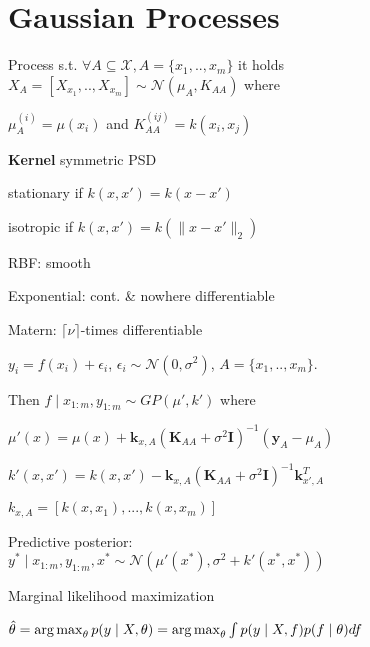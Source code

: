 \section{Gaussian Processes} 
Process s.t. $\forall A \subseteq \mathcal{X}, A = \{ x_1,.., x_m\}$
it holds {$X_A = [X_{x_1},..,X_{x_m}] \sim \mathcal{N}(\mu_A, K_{AA})$} where

$\mu_A^{(i)} = \mu(x_i)$ and $K_{AA}^{(ij)} = k(x_i, x_j)$   

\textbf{Kernel} symmetric PSD

stationary if $k(x,x') = k(x - x')$

isotropic if $k(x,x') = k(\|x - x'\|_2)$

RBF: smooth

Exponential: cont. \& nowhere differentiable

Matern: $\lceil\nu\rceil$-times differentiable


$y_i = f(x_i) + \epsilon_i$, $\epsilon_i \sim \mathcal{N}(0, \sigma^2)$, \mbox{\fontsize{9.2}{6}\selectfont $A = \{x_1,..,x_m\}$}.

Then {$f \mid  x_{1:m}, y_{1:m} \sim GP(\mu', k')$} where

{$\mu'(x) = \mu(x) + \mathbf{k}_{x,A} (\mathbf{K}_{AA} + \sigma^2 \mathbf{I})^{-1} (\mathbf{y}_A - \mu_A)$}

{$k'(x,x') = k(x, x') - \mathbf{k}_{x,A} (\mathbf{K}_{AA} + \sigma^2 \mathbf{I})^{-1} \mathbf{k}_{x',A}^T$}

$k_{x,A} = [k(x, x_1),..., k(x, x_m)]$

Predictive posterior:\\ $y^* \mid  x_{1:m}, y_{1:m},x^* \sim \mathcal{N}(\mu'(x^*), \sigma^2 + k'(x^*, x^*))$


 Marginal likelihood maximization

$\hat\theta=\operatorname*{arg\,max}_\theta p(y \mid  X, \theta) \\= \operatorname*{arg\,max}_\theta \int p(y \mid  X,f) p(f \mid  \theta) df$


